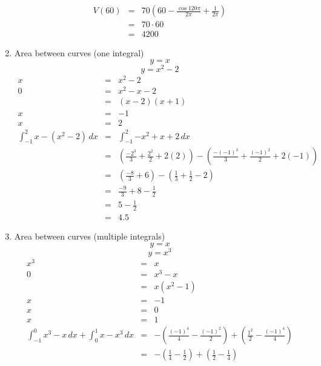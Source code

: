 \documentclass{article}
\begin{document}
\begin{enumerate}
\begin{eqnarray}
            V(60) &=& 70\left(60 - \frac{\cos{120\pi}}{2\pi} + \frac{1}{2\pi}\right) \\
                  &=& 70 \cdot 60 \\
                  &=& 4200
        \end{eqnarray}
    \item Area between curves (one integral)
        $$y = x$$
        $$y = x^2 - 2$$
        \begin{eqnarray}
            x &=& x^2 - 2 \\
            0 &=& x^2 - x - 2 \\
              &=& \left(x-2\right)\left(x+1\right) \\
            x &=& -1 \\
            x &=& 2 \\
            \int_{-1}^2{x - \left(x^2 - 2\right)\,dx} &=& \int_{-1}^2{-x^2 + x + 2\,dx} \\
                                                      &=& \left(\frac{-2^3}{3} + \frac{2^2}{2} + 2(2)\right) - \left(\frac{-(-1)^3}{3} + \frac{(-1)^2}{2} + 2(-1)\right) \\
                                                      &=& \left(\frac{-8}{3} + 6\right) - \left(\frac{1}{3} + \frac{1}{2} - 2\right) \\
                                                      &=& \frac{-9}{3} + 8  - \frac{1}{2} \\
                                                      &=& 5 - \frac{1}{2} \\
                                                      &=& 4.5
        \end{eqnarray}
    \item Area between curves (multiple integrals)
        $$y = x$$
        $$y = x^3$$
        \begin{eqnarray}
            x^3 &=& x \\
            0 &=& x^3 - x \\
              &=& x\left(x^2 - 1\right) \\
            x &=& -1 \\
            x &=& 0 \\
            x &=& 1 \\
            \int_{-1}^0{x^3 - x\,dx} + \int_0^1{x - x^3\,dx} &=& - \left(\frac{(-1)^4}{4} - \frac{(-1)^2}{2}\right) + \left(\frac{1^2}{2} - \frac{(-1)^4}{4}\right) \\
                                                             &=& - \left(\frac{1}{4} - \frac{1}{2}\right) + \left(\frac{1}{2} - \frac{1}{4}\right) \\

\end{eqnarray}
\end{enumerate}
\end{document}
